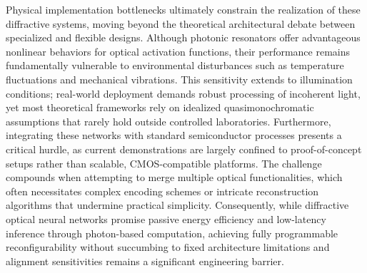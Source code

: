 \documentclass[11pt]{article}
\begin{document}
Physical implementation bottlenecks ultimately constrain the realization of these diffractive systems, moving beyond the theoretical architectural debate between specialized and flexible designs. Although photonic resonators offer advantageous nonlinear behaviors for optical activation functions, their performance remains fundamentally vulnerable to environmental disturbances such as temperature fluctuations and mechanical vibrations. This sensitivity extends to illumination conditions; real-world deployment demands robust processing of incoherent light, yet most theoretical frameworks rely on idealized quasimonochromatic assumptions that rarely hold outside controlled laboratories. Furthermore, integrating these networks with standard semiconductor processes presents a critical hurdle, as current demonstrations are largely confined to proof-of-concept setups rather than scalable, CMOS-compatible platforms. The challenge compounds when attempting to merge multiple optical functionalities, which often necessitates complex encoding schemes or intricate reconstruction algorithms that undermine practical simplicity. Consequently, while diffractive optical neural networks promise passive energy efficiency and low-latency inference through photon-based computation, achieving fully programmable reconfigurability without succumbing to fixed architecture limitations and alignment sensitivities remains a significant engineering barrier. \citep{doi_10_3390_nano14080697_c372a140} \citep{doi_10_1364_oe_523619_ddeb1b53} \citep{doi_10_1038_s41467_022_28702_0_1b79b43c} \citep{doi_10_1364_optica_583686_6b84680e} \citep{doi_10_1002_lpor_202200348_d54cae18}
\end{document}
